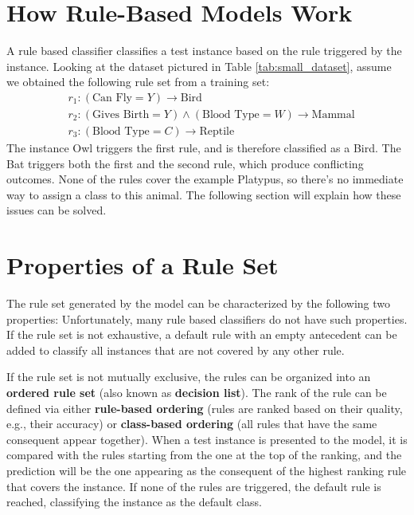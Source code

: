 \section{How Rule-Based Models Work}

A rule based classifier classifies a test instance based on the rule triggered by the instance. Looking at the dataset pictured in Table \ref{tab:small_dataset}, assume we obtained the following rule set from a training set:
\begin{align*}
    &r_1 : (\text{Can Fly} = Y) \rightarrow{} \text{Bird} \\
    &r_2 : (\text{Gives Birth} = Y) \land (\text{Blood Type} = W) \rightarrow{} \text{Mammal} \\
    &r_3 : (\text{Blood Type} = C) \rightarrow{} \text{Reptile}
\end{align*}
The instance Owl triggers the first rule, and is therefore classified as a Bird. The Bat triggers both the first and the second rule, which produce conflicting outcomes. None of the rules cover the example Platypus, so there's no immediate way to assign a class to this animal. The following section will explain how these issues can be solved.

\section{Properties of a Rule Set}

The rule set generated by the model can be characterized by the following two properties:
Unfortunately, many rule based classifiers do not have such properties. If the rule set is not exhaustive, a default rule with an empty antecedent can be added to classify all instances that are not covered by any other rule.

If the rule set is not mutually exclusive, the rules can be organized into an \textbf{ordered rule set} (also known as \textbf{decision list}).
The rank of the rule can be defined via either \textbf{rule-based ordering} (rules are ranked based on their quality, e.g., their accuracy) or \textbf{class-based ordering} (all rules that have the same consequent appear together). When a test instance is presented to the model, it is compared with the rules starting from the one at the top of the ranking, and the prediction will be the one appearing as the consequent of the highest ranking rule that covers the instance. If none of the rules are triggered, the default rule is reached, classifying the instance as the default class.

